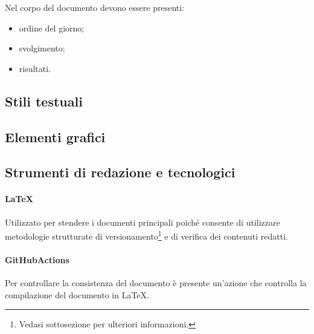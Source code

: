 Nel corpo del documento devono essere presenti:

\begin{itemize}
    \item ordine del giorno;
    \item svolgimento;
    \item risultati.
\end{itemize}


\subsection{Stili testuali}
\subsection{Elementi grafici}
\subsection{Strumenti di redazione e tecnologici}

\paragraph{\LaTeX} Utilizzato per stendere i documenti principali poiché consente di utilizzare metodologie strutturate di versionamento\footnote{Vedasi sottosezione  per ulteriori informazioni.} e di verifica dei contenuti redatti.

\paragraph{GitHubActions} Per controllare la consistenza del documento è presente un'azione che controlla la compilazione del documento in \LaTeX.
